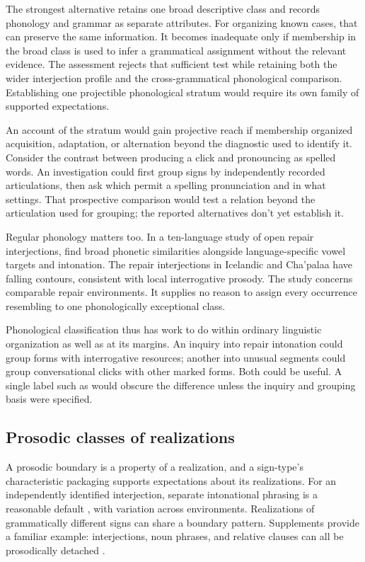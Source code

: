 \documentclass[12pt]{article}
\begin{document}
The strongest alternative retains one broad descriptive class and records
phonology and grammar as separate attributes. For organizing known cases,
that can preserve the same information. It becomes inadequate only if
membership in the broad class is used to infer a grammatical assignment
without the relevant evidence. The assessment rejects
that sufficient test while retaining both the wider interjection profile
and the cross-grammatical phonological comparison. Establishing one projectible
phonological stratum would require its own family of supported expectations.

An account of the stratum would gain projective reach if membership
organized acquisition, adaptation, or alternation beyond the diagnostic
used to identify it. Consider the contrast between producing a click
and pronouncing  as spelled words. An investigation
could first group signs by independently recorded articulations, then
ask which permit a spelling pronunciation and in what settings.
That prospective comparison would test a relation beyond the articulation
used for grouping; the reported alternatives don't yet establish it.

Regular phonology matters too. In a ten-language study of open repair
interjections, \textcite{dingemanse2013huh} find broad phonetic similarities
alongside language-specific vowel targets and intonation. The repair interjections in Icelandic and
Cha'palaa have falling contours, consistent with local interrogative
prosody. The study concerns comparable repair environments. It supplies
no reason to assign every occurrence resembling  to one
phonologically exceptional class.

Phonological classification thus has work to do within ordinary linguistic
organization as well as at its margins. An inquiry into repair intonation
could group forms with interrogative resources; another into unusual
segments could group conversational clicks with other marked forms.
Both could be useful. A single label such as  would obscure
the difference unless the inquiry and grouping basis were specified.

\subsection{Prosodic classes of realizations}

A prosodic boundary is a property of a realization, and a sign-type's
characteristic packaging supports expectations about its realizations.
For an independently identified interjection, separate intonational
phrasing is a reasonable default \citep[108]{ameka1992}, with
variation across environments. Realizations of
grammatically different signs can share a boundary pattern. Supplements
provide a familiar example: interjections, noun phrases, and relative
clauses can all be prosodically detached
\citep[66, 1350]{HuddlestonPullum2002}.
\end{document}
